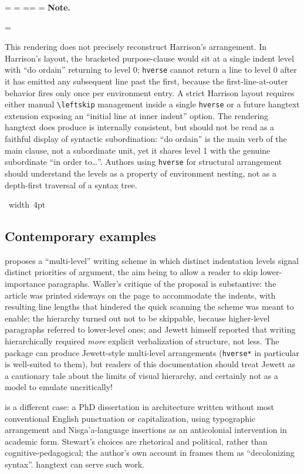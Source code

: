 \documentclass[11pt, twoside, openany]{article}
\makeatletter
\newcommand{\pkg}[1]{\textsf{#1}}
\newcommand{\env}[1]{\texttt{#1}}
\newcommand{\cs}[1]{\texttt{\textbackslash #1}}
\newcommand*{\cns@tag@artifact@begin}{}
\newcommand*{\cns@tag@artifact@end}{}
\newenvironment{TodoNote}[1][]{%
  \par\addvspace{0.5\baselineskip plus 2pt}%
  \setbox\cns@box=\vbox\bgroup
    \hsize=\linewidth
    \advance\hsize -10pt
    \linewidth=\hsize \columnwidth=\hsize
    \parindent=\z@
    \noindent\textbf{\sffamily Note\cns@ifnotempty{#1}{ \textmd{(#1)}}.}%
    \par\nobreak
    \@afterindentfalse\@afterheading
    \leftskip=\cns@indent\relax
    \ignorespaces
}{%
  \par
  \egroup
  \vbox{\hbox{%
    \cns@tag@artifact@begin\vrule width 4pt\cns@tag@artifact@end
    \hskip 6pt\relax
    \box\cns@box
  }}%
  \par\addvspace{0.5\baselineskip plus 2pt}%
}
\makeatother
\begin{document}
\begin{TodoNote}
    This rendering does not precisely reconstruct Harrison's arrangement. In Harrison's layout, the bracketed purpose-clause would sit at a single indent level with ``do ordain'' returning to level 0; \env{hverse} cannot return a line to level 0 after it has emitted any subsequent line past the first, because the first-line-at-outer behavior fires only once per environment entry. A strict Harrison layout requires either manual \cs{leftskip} management inside a single \env{hverse} or a future \pkg{hangtext} extension exposing an ``initial line at inner indent'' option. The rendering \pkg{hangtext} does produce is internally consistent, but should not be read as a faithful display of syntactic subordination: ``do ordain'' is the main verb of the main clause, not a subordinate unit, yet it shares level 1 with the genuine subordinate ``in order to\ldots''. Authors using \env{hverse} for structural arrangement should understand the levels as a property of environment nesting, not as a depth-first traversal of a syntax tree.
\end{TodoNote}

\subsection{Contemporary examples}\label{subsec:contemporary}

\cite{jewett1981} proposes a ``multi-level'' writing scheme in which distinct indentation levels signal distinct priorities of argument, the aim being to allow a reader to skip lower-importance paragraphs. Waller's critique of the proposal is substantive: the article was printed sideways on the page to accommodate the indents, with resulting line lengths that hindered the quick scanning the scheme was meant to enable; the hierarchy turned out not to be skippable, because higher-level paragraphs referred to lower-level ones; and Jewett himself reported that writing hierarchically required \emph{more} explicit verbalization of structure, not less. The package can produce Jewett-style multi-level arrangements (\env{hverse*} in particular is well-suited to them), but readers of this documentation should treat Jewett as a cautionary tale about the limits of visual hierarchy, and certainly not as a model to emulate uncritically!

\cite{stewart2015} is a different case: a PhD dissertation in architecture written without most conventional English punctuation or capitalization, using typographic arrangement and Nisga'a-language insertions as an anticolonial intervention in academic form. Stewart's choices are rhetorical and political, rather than cognitive-pedagogical; the author's own account in \cite{stewart2019} frames them as ``decolonizing syntax''. \pkg{hangtext} can serve such work.
\end{document}
